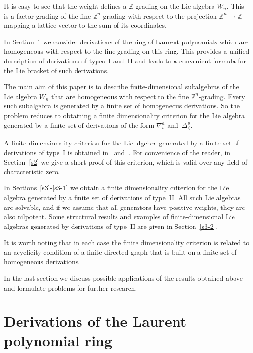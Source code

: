 \documentclass[a4paper, 12pt,oneside,reqno]{amsart}
\numberwithin{equation}{section}
\theoremstyle{definition}
\begin{document}
It is easy to see that the weight defines a $\mathbb{Z}$-grading on the Lie algebra $W_n$. This is a factor-grading of the fine $\mathbb{Z}^n$-grading with respect to the projection
$\mathbb{Z}^n\to\mathbb{Z}$ mapping a lattice vector to the sum of its coordinates. 

In Section~\ref{s1-1} we consider derivations of the ring of Laurent polynomials which are homogeneous with respect to the fine grading on this ring. This provides a unified description of derivations of types~I and~II and leads to a convenient formula for the Lie bracket of such derivations.

The main aim of this paper is to describe finite-dimensional subalgebras of the Lie algebra $W_n$ that are homogeneous with respect to the fine $\mathbb{Z}^n$-grading. Every such subalgebra is generated by a finite set of homogeneous derivations. So the problem reduces to obtaining a finite dimensionality criterion for the Lie algebra generated by a finite set of derivations of the form $\nabla^a_i$ and~$\Delta^p_{\beta}$.

A finite dimensionality criterion for the Lie algebra generated by a finite set of derivations of type~I is obtained in~\cite{ALS} and~\cite{AZ}. For convenience of the reader, in Section~\ref{s2} we give a short proof of this criterion, which is valid over any field of characteristic zero.  

In Sections~\ref{s3}-\ref{s3-1} we obtain a finite dimensionality criterion for the Lie algebra generated by a finite set of derivations of type~II. All such Lie algebras are solvable, and if we assume that all generators have positive weights, they are also nilpotent. Some structural results and examples of finite-dimensional Lie algebras generated by derivations of type~II are given in Section~\ref{s3-2}.  

It is worth noting that in each case the finite dimensionality criterion is related to an acyclicity condition of a finite directed graph that is built on a finite set of homogeneous derivations. 

In the last section we discuss possible applications of the results obtained above and formulate problems for further research.

\section{Derivations of the Laurent polynomial ring}\label{s1-1}
\end{document}

